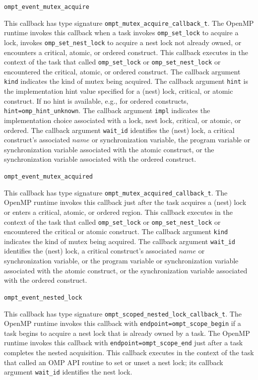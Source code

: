 \documentclass{article}
\newcommand{\descheader}[1]{{\needspace{3\baselineskip}\vspace{1em}\noindent \fbox{#1}}}
\begin{document}
\descheader{Lock, Nest Lock, Critical Section, Atomic, and Ordered}

\begin{description}

\item \verb|ompt_event_mutex_acquire| 

\sloppy
   This callback has type signature \verb|ompt_mutex_acquire_callback_t|. 
   The OpenMP runtime invokes this callback when a task invokes
    \verb|omp_set_lock| to acquire a lock, invokes \verb|omp_set_nest_lock| to acquire a nest lock not already owned,
   or encounters a critical, atomic, or ordered construct. 
   This callback executes in the context of the task that called \verb|omp_set_lock| or \verb|omp_set_nest_lock| or encountered the
   critical, atomic, or ordered construct.
    The callback argument \verb|kind| indicates the kind of mutex being acquired.
    The callback argument \verb|hint| is the implementation hint value specified for a (nest) lock, critical, or atomic construct.
    If no hint is available, e.g., for ordered constructs, \verb|hint=omp_hint_unknown|.
   The callback argument \verb|impl| indicates the implementation choice associated with a lock, nest lock, critical, or atomic, or ordered.
   The callback argument \verb|wait_id| identifies the (nest) lock, a critical construct's associated $name$ or synchronization variable, the program variable or synchronization variable associated with the atomic construct, or the synchronization variable associated with the ordered construct.

\item \verb|ompt_event_mutex_acquired| 

   This callback has type signature \verb|ompt_mutex_acquired_callback_t|. 
   The OpenMP runtime invokes this callback just after the task acquires a (nest) lock or enters a critical, atomic, or ordered region.
   This callback executes in the context of the task that called \verb|omp_set_lock| or \verb|omp_set_nest_lock| or encountered the
   critical or atomic construct.
   The callback argument \verb|kind| indicates the kind of mutex being acquired.
   The callback argument \verb|wait_id| identifies the (nest) lock, a critical construct's associated $name$ or synchronization variable, or the program variable or synchronization variable associated with the atomic construct, or the synchronization variable associated with the ordered construct.

\item \verb|ompt_event_nested_lock|

\sloppy
   This callback  has type signature \verb|ompt_scoped_nested_lock_callback_t|. 
   The OpenMP runtime invokes this callback with \verb|endpoint=|\verb|ompt_scope_begin| if a task begins to acquire a nest lock that is already owned by a task.
   The OpenMP runtime invokes this callback with \verb|endpoint=|\verb|ompt_scope_end|  just after a task completes the nested acquisition.
   This callback executes in the context of the task that called an OMP API routine to set or unset a nest lock; its
   callback argument \verb|wait_id| identifies the nest lock.

\end{description}
\end{document}
